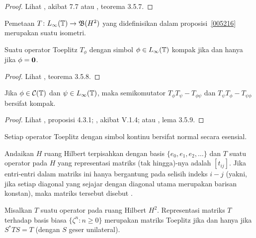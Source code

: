 \begin{proof} Lihat \cite{Douglas:1972}, akibat 7.7 atau \cite{Murphy:1990}, teorema 3.5.7. \ns
\end{proof}

\begin{cor} Pemetaan $T\colon L_\infty(\mathbb{T}) \rightarrow \mathfrak{B}(H^2)$ yang didefinisikan dalam
proposisi~\ref{005216} merupakan suatu isometri.
\end{cor}

\begin{prop} Suatu operator Toeplitz $T_\phi$ dengan simbol $\phi \in L_\infty(\mathbb{T})$ kompak jika
dan hanya jika $\phi = \mathbf{0}$.
\end{prop}

\begin{proof} Lihat \cite{Murphy:1990}, teorema 3.5.8.  \ns \end{proof}

\begin{prop} Jika $\phi \in \mathcal{C}(\mathbb{T})$ dan $\psi \in L_\infty(\mathbb{T})$, maka
semikomutator $T_\phi T_\psi - T_{\phi\psi}$ dan $T_\psi T_\phi - T_{\psi\phi}$ bersifat
kompak.
\end{prop}

\begin{proof} Lihat \cite{Arveson:2002}, proposisi 4.3.1; \cite{Davidson:1996}, akibat
V.1.4; atau \cite{Murphy:1990}, lema 3.5.9. \ns
\end{proof}

\begin{cor} Setiap operator Toeplitz dengan simbol kontinu bersifat normal secara esensial.
\end{cor}

\begin{defn} Andaikan $H$ ruang Hilbert terpisahkan dengan basis $\{e_0, e_1, e_2,
\dots\}$ dan $T$ suatu operator pada $H$ yang representasi matriks (tak hingga)-nya adalah
$[t_{ij}]$. Jika entri-entri dalam matriks ini hanya bergantung pada selisih indeks $i
- j$ (yakni, jika setiap diagonal yang sejajar dengan diagonal utama merupakan barisan konstan),
maka matriks tersebut disebut
.
\end{defn}

\begin{prop} Misalkan $T$ suatu operator pada ruang Hilbert $H^2$. Representasi matriks
$T$ terhadap basis biasa $\{\zeta^n\colon n \ge 0\}$ merupakan matriks Toeplitz jika
dan hanya jika $S^*TS = T$ (dengan $S$ geser unilateral).
\end{prop}


